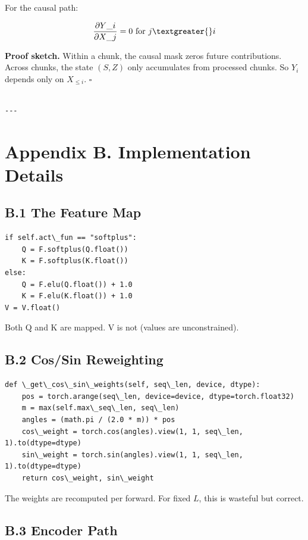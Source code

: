 For the causal path:

\[
\frac{\partial Y\_i}{\partial X\_j} = 0 \text{ for } j \textgreater{} i
\]

\textbf{Proof sketch.} Within a chunk, the causal mask zeros future contributions. 
Across chunks, the state $(S, Z)$ only accumulates from processed chunks. 
So $Y_i$ depends only on $X_{\leq i}$. $\square$
\begin{lstlisting}

---
\end{lstlisting}


\section{Appendix B. Implementation Details}

\subsection{B.1 The Feature Map}

\begin{lstlisting}
if self.act\_fun == "softplus":
    Q = F.softplus(Q.float())
    K = F.softplus(K.float())
else:
    Q = F.elu(Q.float()) + 1.0
    K = F.elu(K.float()) + 1.0
V = V.float()
\end{lstlisting}

Both Q and K are mapped. V is not (values are unconstrained).

\subsection{B.2 Cos/Sin Reweighting}

\begin{lstlisting}
def \_get\_cos\_sin\_weights(self, seq\_len, device, dtype):
    pos = torch.arange(seq\_len, device=device, dtype=torch.float32)
    m = max(self.max\_seq\_len, seq\_len)
    angles = (math.pi / (2.0 * m)) * pos
    cos\_weight = torch.cos(angles).view(1, 1, seq\_len, 1).to(dtype=dtype)
    sin\_weight = torch.sin(angles).view(1, 1, seq\_len, 1).to(dtype=dtype)
    return cos\_weight, sin\_weight
\end{lstlisting}

The weights are recomputed per forward. For fixed $L$, this is wasteful 
but correct.

\subsection{B.3 Encoder Path}

